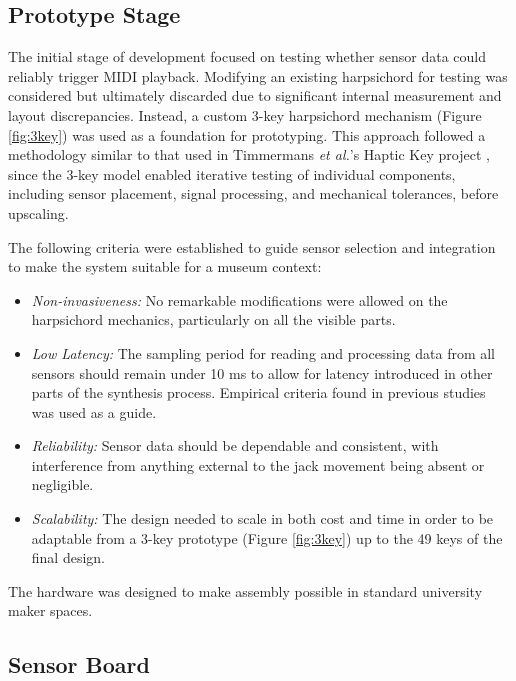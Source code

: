 \subsection{Prototype Stage}

The initial stage of development focused on testing whether sensor data could
reliably trigger MIDI playback. Modifying an existing harpsichord for testing
was considered but ultimately discarded due to significant internal measurement
and layout discrepancies. Instead, a custom 3-key harpsichord mechanism (Figure
\ref{fig:3key}) was used as a foundation for prototyping. This approach followed
a methodology similar to that used in Timmermans \emph{et al.}'s Haptic Key
project \cite{Timmermans2020}, since the 3-key model enabled iterative testing
of individual components, including sensor placement, signal processing, and
mechanical tolerances, before upscaling.

The following criteria were established to guide sensor selection and
integration to make the system suitable for a museum context:

\begin{itemize}
  \item \emph{Non-invasiveness:} No remarkable modifications were allowed on the
    harpsichord mechanics, particularly on all the visible parts.
  \item \emph{Low Latency:} The sampling period for reading and processing data
    from all sensors should remain under 10 ms to allow for latency introduced in
    other parts of the synthesis process. Empirical criteria found in previous
    studies \cite{Jack2016} was used as a guide.
  \item \emph{Reliability:} Sensor data should be dependable and consistent,
    with interference from anything external to the jack movement being absent or
    negligible.
  \item \emph{Scalability:} The design needed to scale in both cost and time in
    order to be adaptable from a 3-key prototype (Figure \ref{fig:3key}) up to the
    49 keys of the final design.    
\end{itemize}

The hardware was designed to make assembly possible in standard university maker
spaces.

\subsection{Sensor Board}\label{sensor-board}

